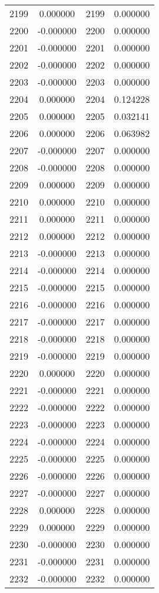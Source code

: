 \documentclass[12pt]{article}
\begin{document}
\begin{longtable}{@{}cccc@{}}
2199 & 0.000000 & 2199 & 0.000000 \\
2200 & -0.000000 & 2200 & 0.000000 \\
2201 & -0.000000 & 2201 & 0.000000 \\
2202 & -0.000000 & 2202 & 0.000000 \\
2203 & -0.000000 & 2203 & 0.000000 \\
2204 & 0.000000 & 2204 & 0.124228 \\
2205 & 0.000000 & 2205 & 0.032141 \\
2206 & 0.000000 & 2206 & 0.063982 \\
2207 & -0.000000 & 2207 & 0.000000 \\
2208 & -0.000000 & 2208 & 0.000000 \\
2209 & 0.000000 & 2209 & 0.000000 \\
2210 & 0.000000 & 2210 & 0.000000 \\
2211 & 0.000000 & 2211 & 0.000000 \\
2212 & 0.000000 & 2212 & 0.000000 \\
2213 & -0.000000 & 2213 & 0.000000 \\
2214 & -0.000000 & 2214 & 0.000000 \\
2215 & -0.000000 & 2215 & 0.000000 \\
2216 & -0.000000 & 2216 & 0.000000 \\
2217 & -0.000000 & 2217 & 0.000000 \\
2218 & -0.000000 & 2218 & 0.000000 \\
2219 & -0.000000 & 2219 & 0.000000 \\
2220 & 0.000000 & 2220 & 0.000000 \\
2221 & -0.000000 & 2221 & 0.000000 \\
2222 & -0.000000 & 2222 & 0.000000 \\
2223 & -0.000000 & 2223 & 0.000000 \\
2224 & -0.000000 & 2224 & 0.000000 \\
2225 & -0.000000 & 2225 & 0.000000 \\
2226 & -0.000000 & 2226 & 0.000000 \\
2227 & -0.000000 & 2227 & 0.000000 \\
2228 & 0.000000 & 2228 & 0.000000 \\
2229 & 0.000000 & 2229 & 0.000000 \\
2230 & -0.000000 & 2230 & 0.000000 \\
2231 & -0.000000 & 2231 & 0.000000 \\
2232 & -0.000000 & 2232 & 0.000000 \\

\end{longtable}
\end{document}

